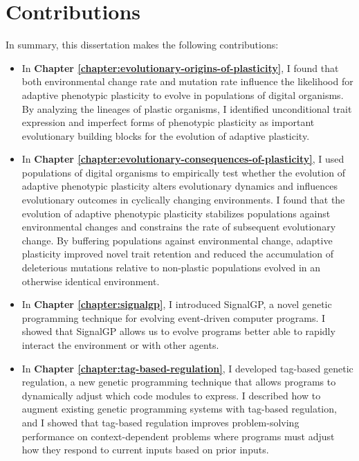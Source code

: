 \section{Contributions}

In summary, this dissertation makes the following contributions:


\begin{itemize}
    \item In \textbf{Chapter \ref{chapter:evolutionary-origins-of-plasticity}}, I found that both environmental change rate and mutation rate influence the likelihood for adaptive phenotypic plasticity to evolve in populations of digital organisms. 
    By analyzing the lineages of plastic organisms, I identified unconditional trait expression and imperfect forms of phenotypic plasticity as important evolutionary building blocks for the evolution of adaptive plasticity. 
    
    \item In \textbf{Chapter \ref{chapter:evolutionary-consequences-of-plasticity}}, I used populations of digital organisms to empirically test whether the evolution of adaptive phenotypic plasticity alters evolutionary dynamics and influences evolutionary outcomes in cyclically changing environments.
    I found that the evolution of adaptive phenotypic plasticity stabilizes populations against environmental changes and constrains the rate of subsequent evolutionary change.
    By buffering populations against environmental change, adaptive plasticity improved novel trait retention and reduced the accumulation of deleterious mutations relative to non-plastic populations evolved in an otherwise identical environment. 
    
    \item In \textbf{Chapter \ref{chapter:signalgp}}, I introduced SignalGP, a novel genetic programming technique for evolving event-driven computer programs. 
    I showed that SignalGP allows us to evolve programs better able to rapidly interact the environment or with other agents. 
    
    \item In \textbf{Chapter \ref{chapter:tag-based-regulation}}, I developed tag-based genetic regulation, a new genetic programming technique that allows programs to dynamically adjust which code modules to express.
    I described how to augment existing genetic programming systems with tag-based regulation, and I showed that tag-based regulation improves problem-solving performance on context-dependent problems where programs must adjust how they respond to current inputs based on prior inputs.
    

\end{itemize}
